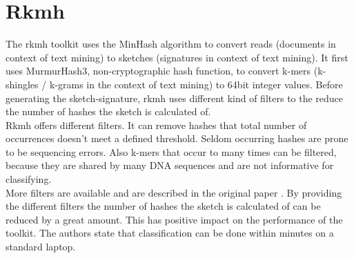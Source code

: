 \section{Rkmh}

The rkmh toolkit uses the MinHash algorithm to convert reads (documents in context of text mining) to sketches (signatures in context of text mining). It first uses MurmurHash3, non-cryptographic hash function, to convert k-mers (k-shingles / k-grams in the context of text mining) to 64bit integer values. Before generating the sketch-signature, rkmh uses different kind of filters to the reduce the number of hashes the sketch is calculated of.\\

Rkmh offers different filters. It can remove hashes that total number of occurrences doesn't meet a defined threshold. Seldom occurring hashes are prone to be sequencing errors. Also k-mers that occur to many times can be filtered, because they are shared by many DNA sequences and are not informative for classifying.\\

More filters are available and are described in the original paper \cite{rkmh}. By providing the different filters the number of hashes the sketch is calculated of can be reduced by a great amount. This has positive impact on the performance of the toolkit. The authors state that classification can be done within minutes on a standard laptop.